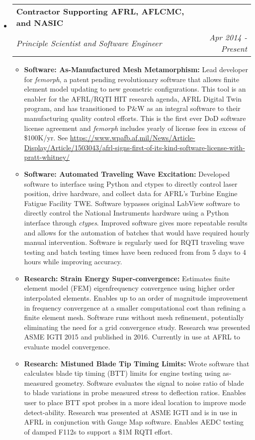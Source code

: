 \documentclass[letterpaper,11pt]{article}
\makeatletter
\newcommand{\resitem}[1]{\item #1 \vspace{-2pt}}
\newcommand{\ressubheading}[4]{
\begin{tabular*}{7.0in}{l@{\extracolsep{\fill}}r}
		\textbf{#1} & #2 \\
		\textit{#3} & \textit{#4} \\
\end{tabular*}\vspace{-6pt}}
\makeatother
\begin{document}
\begin{itemize}
\item
  \ressubheading{Contractor Supporting AFRL, AFLCMC, and NASIC}{}{Principle Scientist and Software Engineer}{Apr 2014 - Present}
  \begin{itemize}
    \resitem{\textbf{Software: As-Manufactured Mesh Metamorphism:} Lead developer for \textit{femorph}, a patent pending revolutionary software that allows finite element model updating to new geometric configurations.  This tool is an enabler for the AFRL/RQTI HIT research agenda, AFRL Digital Twin program, and has transitioned to P\&W as an integral software to their manufacturing quality control efforts.  This is the first ever DoD software license agreement and \textit{femorph} includes yearly of license fees in excess of \$100K/yr.  See \url{https://www.wpafb.af.mil/News/Article-Display/Article/1503043/afrl-signs-first-of-its-kind-software-license-with-pratt-whitney/}}
    \resitem{\textbf{Software: Automated Traveling Wave Excitation:} Developed software to interface using Python and ctypes to directly control laser position, drive hardware, and collect data for AFRL's Turbine Engine Fatigue Facility TWE.  Software bypasses original LabView software to directly control the National Instruments hardware using a Python interface through \textit{ctypes}.  Improved software gives more repeatable results and allows for the automation of batches that would have required hourly manual intervention. Software is regularly used for RQTI traveling wave testing and batch testing times have been reduced from from 5 days to 4 hours while improving accuracy.}
    \resitem{\textbf{Research: Strain Energy Super-convergence:}  Estimates finite element model (FEM) eigenfrequency convergence using higher order interpolated elements.  Enables up to an order of magnitude improvement in frequency convergence at a smaller computational cost than refining a finite element mesh.  Software runs without mesh refinement, potentially eliminating the need for a grid convergence study.  Research was presented ASME IGTI 2015 and published in 2016.  Currently in use at AFRL to evaluate model convergence.}
    \resitem{\textbf{Research: Mistuned Blade Tip Timing Limits:}  Wrote software that calculates blade tip timing (BTT) limits for engine testing using as-measured geometry.  Software evaluates the signal to noise ratio of blade to blade variations in probe measured stress to deflection ratios.  Enables user to place BTT spot probes in a more ideal location to improve mode detect-ability.  Research was presented at ASME IGTI and is in use in AFRL in conjunction with Gauge Map software.  Enables AEDC testing of damped F112s to support a \$1M RQTI effort.}

\end{itemize}
\end{itemize}
\end{document}
